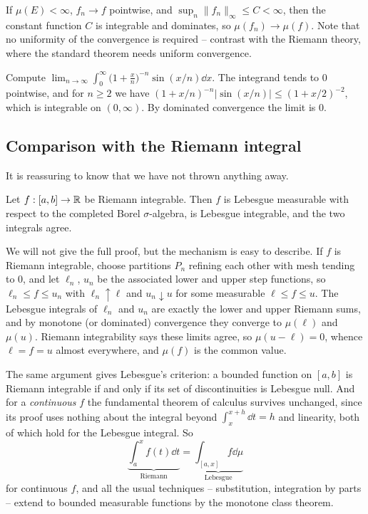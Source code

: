 \documentclass[a4paper]{scrartcl}
\begin{document}
\begin{example}
	If $\mu(E) < \infty$, $f_n \to f$ pointwise, and $\sup_n\|f_n\|_\infty \leq C < \infty$, then the constant function $C$ is integrable and dominates, so $\mu(f_n)\to\mu(f)$. Note that no uniformity of the convergence is required -- contrast with the Riemann theory, where the standard theorem needs uniform convergence.
\end{example}

\begin{example}
	Compute $\lim_{n\to\infty}\int_0^\infty \big(1+\tfrac{x}{n}\big)^{-n}\sin(x/n)\dd x$. The integrand tends to $0$ pointwise, and for $n \geq 2$ we have $(1+x/n)^{-n}|\sin(x/n)| \leq (1+x/2)^{-2}$, which is integrable on $(0,\infty)$. By dominated convergence the limit is $0$.
\end{example}

\subsection{Comparison with the Riemann integral}

It is reassuring to know that we have not thrown anything away.

\begin{theorem}\label{thm:riemann}
	Let $f : [a,b]\to\mathbb{R}$ be Riemann integrable. Then $f$ is Lebesgue measurable with respect to the completed Borel $\sigma$-algebra, is Lebesgue integrable, and the two integrals agree.
\end{theorem}

We will not give the full proof, but the mechanism is easy to describe. If $f$ is Riemann integrable, choose partitions $P_n$ refining each other with mesh tending to $0$, and let $\ell_n$, $u_n$ be the associated lower and upper step functions, so $\ell_n \leq f \leq u_n$ with $\ell_n \uparrow \ell$ and $u_n \downarrow u$ for some measurable $\ell \leq f \leq u$. The Lebesgue integrals of $\ell_n$ and $u_n$ are exactly the lower and upper Riemann sums, and by monotone (or dominated) convergence they converge to $\mu(\ell)$ and $\mu(u)$. Riemann integrability says these limits agree, so $\mu(u - \ell) = 0$, whence $\ell = f = u$ almost everywhere, and $\mu(f)$ is the common value.

\begin{remark}
	The same argument gives Lebesgue's criterion: a bounded function on $[a,b]$ is Riemann integrable if and only if its set of discontinuities is Lebesgue null. And for a \emph{continuous} $f$ the fundamental theorem of calculus survives unchanged, since its proof uses nothing about the integral beyond $\int_x^{x+h}\dd t = h$ and linearity, both of which hold for the Lebesgue integral. So
	$$
	\underbrace{\int_a^x f(t)\dd t}_{\text{Riemann}} = \underbrace{\int_{[a,x]} f \dd\mu}_{\text{Lebesgue}}
	$$
	for continuous $f$, and all the usual techniques -- substitution, integration by parts -- extend to bounded measurable functions by the monotone class theorem.
\end{remark}
\end{document}
